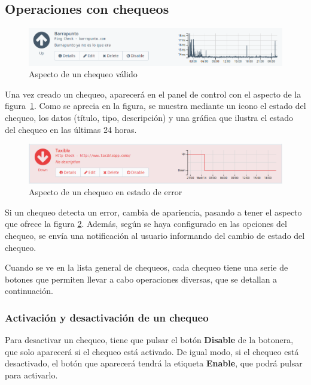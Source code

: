 \subsection{Operaciones con chequeos}

\begin{figure}[hbtp]
  \centering
  \includegraphics[width=\textwidth]{apendice_manual_usuario/chequeo_valido.png}
  \caption{Aspecto de un chequeo válido}
  \label{fig:chequeo}
\end{figure}

Una vez creado un chequeo, aparecerá en el panel de control con el aspecto de la
figura~\ref{fig:chequeo}. Como se aprecia en la figura, se muestra mediante un
icono el estado del chequeo, los datos (título, tipo, descripción) y una gráfica
que ilustra el estado del chequeo en las últimas 24 horas.

\begin{figure}[hbtp]
  \centering
  \includegraphics[width=\textwidth]{apendice_manual_usuario/chequeo_invalido.png}
  \caption{Aspecto de un chequeo en estado de error}
  \label{fig:chequeo-invalido}
\end{figure}

Si un chequeo detecta un error, cambia de apariencia, pasando a tener el aspecto
que ofrece la figura \ref{fig:chequeo-invalido}. Además, según se haya
configurado en las opciones del chequeo, se envía una notificación al usuario
informando del cambio de estado del chequeo.

Cuando se ve en la lista general de chequeos, cada chequeo tiene una serie de
botones que permiten llevar a cabo operaciones diversas, que se detallan a
continuación.

\subsubsection{Activación y desactivación de un chequeo}

Para desactivar un chequeo, tiene que pulsar el botón \textbf{Disable} de la
botonera, que solo aparecerá si el chequeo está activado. De igual modo, si el
chequeo está desactivado, el botón que aparecerá tendrá la etiqueta
\textbf{Enable}, que podrá pulsar para activarlo.

